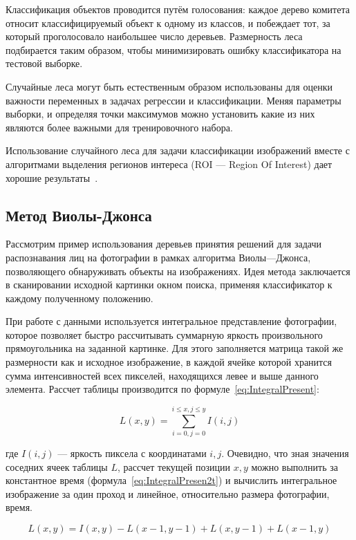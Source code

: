 \documentclass[a4paper,14pt]{extarticle} %
\begin{document}
Классификация объектов проводится путём голосования: каждое дерево комитета относит классифицируемый объект к одному из классов, и побеждает тот, за который проголосовало наибольшее число деревьев. Размерность леса подбирается таким образом, чтобы минимизировать ошибку классификатора на тестовой выборке. 

Случайные леса могут быть естественным образом использованы для оценки важности переменных в задачах регрессии и классификации. Меняя параметры выборки, и определяя точки максимумов можно установить какие из них являются более важными для тренировочного набора. 

Использование случайного леса для задачи классификации изображений вместе с алгоритмами выделения регионов интереса (ROI --- Region Of Interest) дает хорошие результаты~\cite{bosch2007image}.

\subsection{Метод Виолы-Джонса}
\hspace{\parindent} Рассмотрим пример использования деревьев принятия решений для задачи распознавания лиц на фотографии в рамках алгоритма Виолы—Джонса, позволяющего обнаруживать объекты на изображениях. Идея метода заключается в сканировании исходной картинки окном поиска, применяя классификатор к каждому полученному положению.

При работе с данными используется интегральное представление фотографии, которое позволяет быстро рассчитывать суммарную яркость произвольного прямоугольника на заданной картинке. Для этого заполняется матрица такой же размерности как и исходное изображение, в каждой ячейке которой хранится сумма интенсивностей всех пикселей, находящихся левее и выше данного элемента. Рассчет таблицы производится по формуле~\ref{eq:IntegralPresent}:

\begin{equation}\label{eq:IntegralPresent}
L(x,y)=\sum\limits_{i=0,j=0}^{i\leq x, j\leq y} I(i,j)
\end{equation}

\noindent где $I(i,j)$ --- яркость пиксела с координатами $i,j$. Очевидно, что зная значения соседних ячеек таблицы $L$, рассчет текущей позиции $x,y$ можно выполнить за константное время (формула~\ref{eq:IntegralPresen2t}) и вычислить интегральное изображение за один проход и линейное, относительно размера фотографии, время.

\begin{equation}\label{eq:IntegralPresen2t}
L(x,y)=I(x,y)-L(x-1,y-1)+L(x,y-1)+L(x-1,y)
\end{equation}
\end{document}
